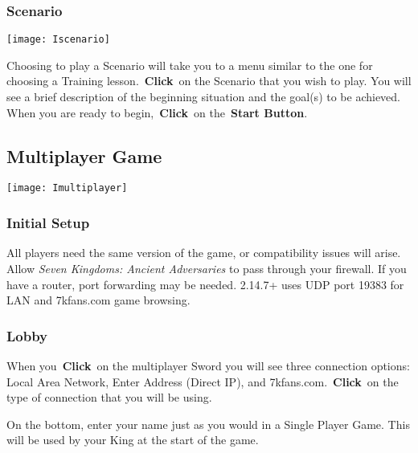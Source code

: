 \subsubsection{Scenario}


\begin{center}
	\texttt{[image: Iscenario]}
\end{center}

Choosing to play a Scenario will take you to a menu similar to the one for choosing a Training lesson. \textbf{Click} on the Scenario that you wish to play. You will see a brief description of the beginning situation and the goal(s) to be achieved. When you are ready to begin, \textbf{Click} on the \textbf{Start Button}.

\subsection{Multiplayer Game}


\begin{center}
	\texttt{[image: Imultiplayer]}
\end{center}

\subsubsection{Initial Setup}


All players need the same version of the game, or compatibility issues will arise. Allow \textit{Seven Kingdoms: Ancient Adversaries} to pass through your firewall. If you have a router, port forwarding may be needed. 2.14.7+ uses UDP port 19383 for LAN and 7kfans.com game browsing.

\subsubsection{Lobby}

When you \textbf{Click} on the multiplayer Sword you will see three connection options: Local Area Network, Enter Address (Direct IP), and 7kfans.com. \textbf{Click} on the type of connection that you will be using.

On the bottom, enter your name just as you would in a Single Player Game. This will be used by your King at the start of the game.

